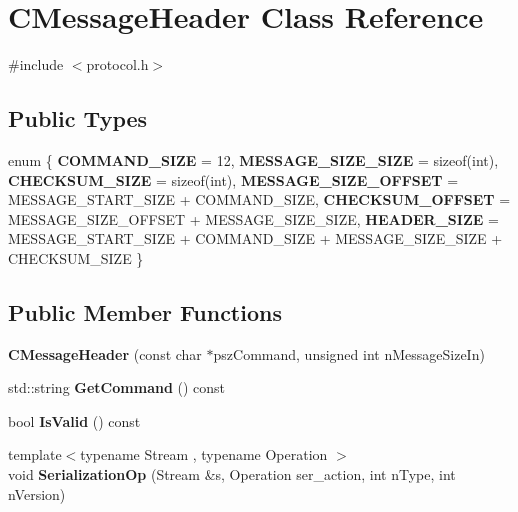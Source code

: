 \hypertarget{class_c_message_header}{}\section{C\+Message\+Header Class Reference}
\label{class_c_message_header}


{\ttfamily \#include $<$protocol.\+h$>$}

\subsection*{Public Types}
\begin{DoxyCompactItemize}
\item 
\mbox{\label{class_c_message_header_a60ccf73c4808cf18bd0d9589e120b46c}} 
enum \{ \newline
{\bfseries C\+O\+M\+M\+A\+N\+D\+\_\+\+S\+I\+ZE} = 12, 
{\bfseries M\+E\+S\+S\+A\+G\+E\+\_\+\+S\+I\+Z\+E\+\_\+\+S\+I\+ZE} = sizeof(int), 
{\bfseries C\+H\+E\+C\+K\+S\+U\+M\+\_\+\+S\+I\+ZE} = sizeof(int), 
{\bfseries M\+E\+S\+S\+A\+G\+E\+\_\+\+S\+I\+Z\+E\+\_\+\+O\+F\+F\+S\+ET} = M\+E\+S\+S\+A\+G\+E\+\_\+\+S\+T\+A\+R\+T\+\_\+\+S\+I\+ZE + C\+O\+M\+M\+A\+N\+D\+\_\+\+S\+I\+ZE, 
\newline
{\bfseries C\+H\+E\+C\+K\+S\+U\+M\+\_\+\+O\+F\+F\+S\+ET} = M\+E\+S\+S\+A\+G\+E\+\_\+\+S\+I\+Z\+E\+\_\+\+O\+F\+F\+S\+ET + M\+E\+S\+S\+A\+G\+E\+\_\+\+S\+I\+Z\+E\+\_\+\+S\+I\+ZE, 
{\bfseries H\+E\+A\+D\+E\+R\+\_\+\+S\+I\+ZE} = M\+E\+S\+S\+A\+G\+E\+\_\+\+S\+T\+A\+R\+T\+\_\+\+S\+I\+ZE + C\+O\+M\+M\+A\+N\+D\+\_\+\+S\+I\+ZE + M\+E\+S\+S\+A\+G\+E\+\_\+\+S\+I\+Z\+E\+\_\+\+S\+I\+ZE + C\+H\+E\+C\+K\+S\+U\+M\+\_\+\+S\+I\+ZE
 \}
\end{DoxyCompactItemize}
\subsection*{Public Member Functions}
\begin{DoxyCompactItemize}
\item 
\mbox{\label{class_c_message_header_a4e68c30f9e7e485c13157a27c4ebff8c}} 
{\bfseries C\+Message\+Header} (const char $\ast$psz\+Command, unsigned int n\+Message\+Size\+In)
\item 
\mbox{\label{class_c_message_header_ab5b3807481d4b918527b86523f1efee2}} 
std\+::string {\bfseries Get\+Command} () const
\item 
\mbox{\label{class_c_message_header_a45221ad4c5e867c80d4ca33eb8918f36}} 
bool {\bfseries Is\+Valid} () const
\item 
\mbox{\label{class_c_message_header_a3881923a93297c3a7a8e413ab3730408}} 
{\footnotesize template$<$typename Stream , typename Operation $>$ }\\void {\bfseries Serialization\+Op} (Stream \&s, Operation ser\+\_\+action, int n\+Type, int n\+Version)
\end{DoxyCompactItemize}
